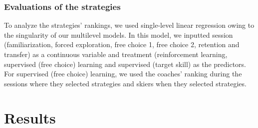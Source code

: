 \documentclass[pdflatex,sn-mathphys-num]{sn-jnl}%
\theoremstyle{thmstyleone}%
\theoremstyle{thmstyletwo}%
\theoremstyle{thmstylethree}%
\begin{document}
\subsubsection{Evaluations of the strategies}
To analyze the strategies' rankings, we used single-level linear regression owing to the singularity of our multilevel models. In this model, we inputted session (familiarization, forced exploration, free choice 1, free choice 2, retention and transfer) as a continuous variable and treatment (reinforcement learning, supervised (free choice) learning and supervised (target skill) as the predictors. For supervised (free choice) learning, we used the coaches' ranking during the sessions where they selected strategies and skiers when they selected strategies.



\section{Results}
\end{document}
